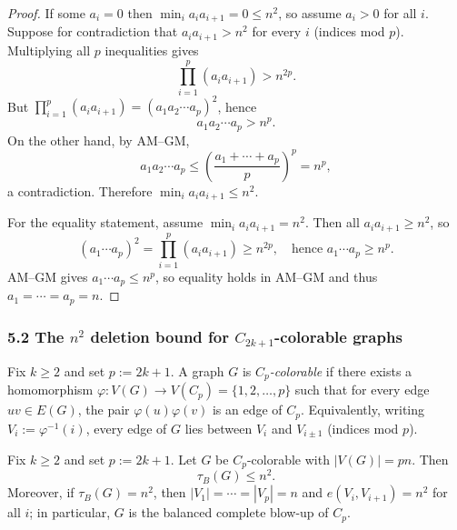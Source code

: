 \begin{proof}
If some $a_i=0$ then $\min_i a_i a_{i+1}=0\le n^2$, so assume $a_i>0$ for all $i$.
Suppose for contradiction that $a_i a_{i+1} > n^2$ for every $i$ (indices mod $p$).
Multiplying all $p$ inequalities gives
\[
\prod_{i=1}^p (a_i a_{i+1}) > n^{2p}.
\]
But $\prod_{i=1}^p (a_i a_{i+1}) = (a_1a_2\cdots a_p)^2$, hence
\[
a_1a_2\cdots a_p > n^{p}.
\]
On the other hand, by AM--GM,
\[
a_1a_2\cdots a_p \le \left(\frac{a_1+\cdots+a_p}{p}\right)^p = n^p,
\]
a contradiction. Therefore $\min_i a_i a_{i+1}\le n^2$.

For the equality statement, assume $\min_i a_i a_{i+1}=n^2$.
Then all $a_i a_{i+1}\ge n^2$, so
\[
(a_1\cdots a_p)^2=\prod_{i=1}^p (a_i a_{i+1}) \ge n^{2p},
\quad\text{hence } a_1\cdots a_p\ge n^p.
\]
AM--GM gives $a_1\cdots a_p\le n^p$, so equality holds in AM--GM and thus
$a_1=\cdots=a_p=n$.
\end{proof}

\subsubsection*{5.2 The $n^2$ deletion bound for $C_{2k+1}$-colorable graphs}
\begin{definition}
Fix $k\ge 2$ and set $p:=2k+1$.
A graph $G$ is \emph{$C_{p}$-colorable} if there exists a homomorphism
$\varphi:V(G)\to V(C_{p})=\{1,2,\dots,p\}$ such that for every edge $uv\in E(G)$,
the pair $\varphi(u)\varphi(v)$ is an edge of $C_{p}$.
Equivalently, writing $V_i:=\varphi^{-1}(i)$, every edge of $G$ lies between
$V_i$ and $V_{i\pm 1}$ (indices mod $p$).
\end{definition}

\begin{theorem}\label{thm:Coddcolorable}
Fix $k\ge 2$ and set $p:=2k+1$.
Let $G$ be $C_p$-colorable with $|V(G)|=pn$.
Then
\[
\tau_B(G)\le n^2.
\]
Moreover, if $\tau_B(G)=n^2$, then $|V_1|=\cdots=|V_p|=n$ and
$e(V_i,V_{i+1})=n^2$ for all $i$; in particular, $G$ is the balanced complete
blow-up of $C_p$.
\end{theorem}

